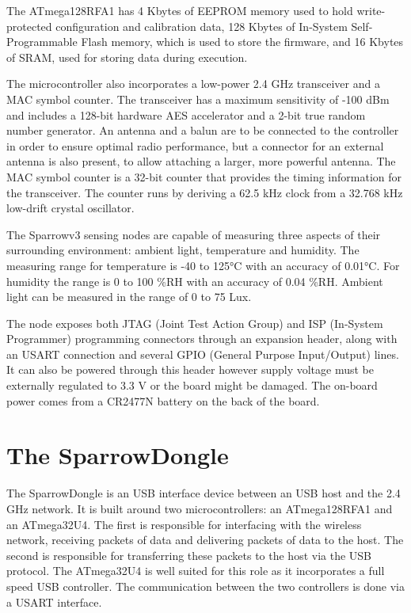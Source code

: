 The \mbox{ATmega128RFA1} has 4 Kbytes of EEPROM memory used to hold
write-protected configuration and calibration data, 128 Kbytes of In-System
Self-Programmable Flash memory, which is used to store the firmware, and 16
Kbytes of SRAM, used for storing data during execution.

The microcontroller also incorporates a low-power 2.4 GHz transceiver and a MAC
symbol counter. The transceiver has a maximum sensitivity of -100 dBm and
includes a 128-bit hardware AES accelerator and a 2-bit true random number
generator. An antenna and a balun are to be connected to the controller in order
to ensure optimal radio performance, but a connector for an external antenna is
also present, to allow attaching a larger, more powerful antenna. The MAC
symbol counter is a 32-bit counter that provides the timing information for the
transceiver. The counter runs by deriving a 62.5 kHz clock from a 32.768 kHz
low-drift crystal oscillator. 

The Sparrowv3 sensing nodes are capable of measuring three aspects of their
surrounding environment: ambient light, temperature and humidity. The measuring
range for temperature is -40 to 125°C with an accuracy of 0.01°C. For humidity
the range is 0 to 100 \%RH with an accuracy of 0.04 \%RH. Ambient light can be
measured in the range of 0 to 75 Lux.

The node exposes both JTAG (Joint Test Action Group) and ISP (In-System
Programmer) programming connectors through an expansion header, along with an
USART connection and several GPIO (General Purpose Input/Output) lines. It can
also be powered through this header however supply voltage must be externally
regulated to 3.3 V or the board might be damaged.  The on-board power comes
from a CR2477N battery on the back of the board.

\section{The SparrowDongle}

The SparrowDongle is an USB interface device between an USB host and the 2.4 GHz
network. It is built around two microcontrollers: an ATmega128RFA1 and an
ATmega32U4. The first is responsible for interfacing with the wireless network,
receiving packets of data and delivering packets of data to the host. The
second is responsible for transferring these packets to the host via the USB
protocol. The ATmega32U4 is well suited for this role as it incorporates a full
speed USB controller. The communication between the two controllers is done via
a USART interface.

